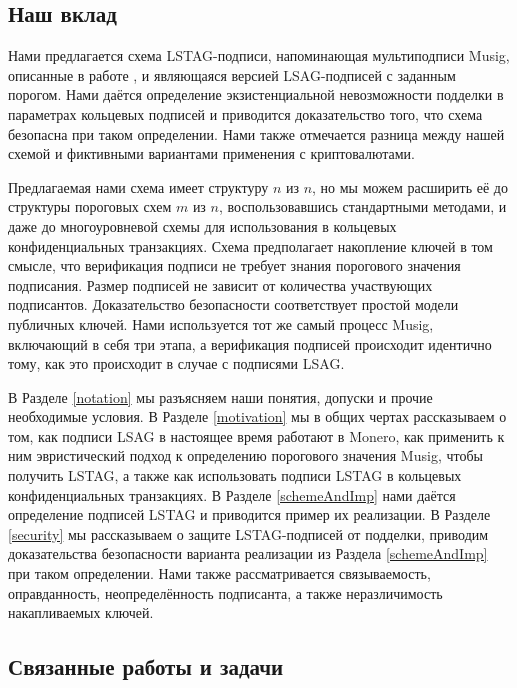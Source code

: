 \documentclass{mrl}
\theoremstyle{definition}
\numberwithin{theorem}{subsection}
\begin{document}
\subsection{Наш вклад}

Нами предлагается схема LSTAG-подписи, напоминающая мультиподписи Musig, описанные в работе \cite{maxwell2018simple}, и являющаяся версией LSAG-подписей с заданным порогом. Нами даётся определение экзистенциальной невозможности подделки в параметрах кольцевых подписей и приводится доказательство того, что схема безопасна при таком определении. Нами также отмечается разница между нашей схемой и фиктивными вариантами применения с криптовалютами.

Предлагаемая нами схема имеет структуру $n$ из $n$, но мы можем расширить её до структуры пороговых схем $m$ из $n$, воспользовавшись стандартными методами, и даже до многоуровневой схемы для использования в кольцевых конфиденциальных транзакциях. Схема предполагает накопление ключей в том смысле, что верификация подписи не требует знания порогового значения подписания. Размер подписей не зависит от количества участвующих подписантов. Доказательство безопасности соответствует простой модели публичных ключей. Нами используется тот же самый процесс Musig, включающий в себя три этапа, а верификация подписей происходит идентично тому, как это происходит в случае с подписями LSAG.

В Разделе \ref{notation} мы разъясняем наши понятия, допуски и прочие необходимые условия. В Разделе \ref{motivation} мы в общих чертах рассказываем о том, как подписи LSAG в настоящее время работают в Monero, как применить к ним эвристический подход к определению порогового значения Musig, чтобы получить LSTAG, а также как использовать подписи LSTAG в кольцевых конфиденциальных транзакциях. В Разделе \ref{schemeAndImp} нами даётся определение подписей LSTAG и приводится пример их реализации. В Разделе \ref{security} мы рассказываем о защите LSTAG-подписей от подделки, приводим доказательства безопасности варианта реализации из Раздела \ref{schemeAndImp} при таком определении. Нами также рассматривается связываемость, оправданность, неопределённость подписанта, а также неразличимость накапливаемых ключей.


\subsection{Связанные работы и задачи}
\end{document}
